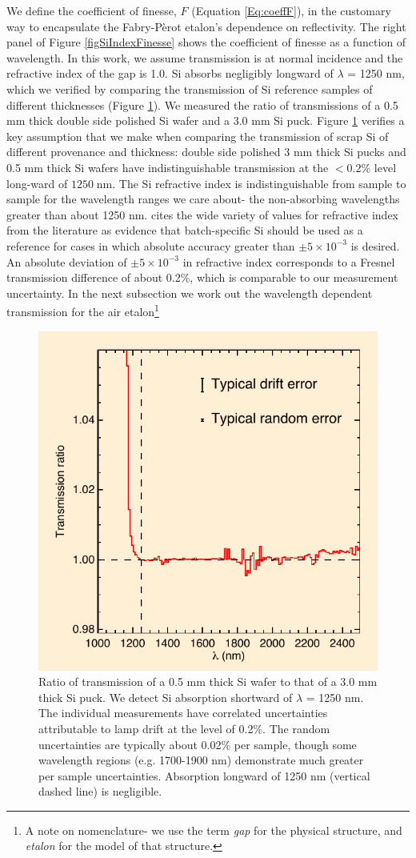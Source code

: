 \documentclass[osajnl,preprint,showpacs,superscriptaddress,12pt]{revtex4-1} %
\begin{document}
We define the coefficient of finesse\cite{2007fuph.book.....S}, $F$ (Equation \ref{Eq:coeffF}), in the customary way to encapsulate the Fabry-P\`{e}rot etalon's dependence on reflectivity.  The right panel of Figure \ref{figSiIndexFinesse} shows the coefficient of finesse as a function of wavelength.  In this work, we assume transmission is at normal incidence and the refractive index of the gap is 1.0.  Si absorbs negligibly longward of $\lambda$ = 1250 nm, which we verified by comparing the transmission of Si reference samples of different thicknesses (Figure \ref{figSiAbsorbfig}).  We measured the ratio of transmissions of a 0.5 mm thick double side polished Si wafer and a 3.0 mm Si puck.  Figure \ref{figSiAbsorbfig} verifies a key assumption that we make when comparing the transmission of scrap Si of different provenance and thickness: double side polished 3 mm thick Si pucks and 0.5 mm thick Si wafers have indistinguishable transmission at the $<0.2$\% level long-ward of $1250\;$nm.  The Si refractive index is indistinguishable from sample to sample for the wavelength ranges we care about- the non-absorbing wavelengths greater than about 1250 nm.  \cite{2006SPIE.6273E..77F} cites the wide variety of values for refractive index from the literature as evidence that batch-specific Si should be used as a reference for cases in which absolute accuracy greater than $\pm5\times10^{-3}$ is desired.  An absolute deviation of $\pm5\times10^{-3}$ in refractive index corresponds to a Fresnel transmission difference of about 0.2\%, which is comparable to our measurement uncertainty.  In the next subsection we work out the wavelength dependent transmission for the air etalon\footnote{A note on nomenclature- we use the term \emph{gap} for the physical structure, and \emph{etalon} for the model of that structure.}

\begin{figure}[htbp]
\includegraphics[width=0.40\columnwidth]{figs/fpAbsorbfig_alt}
\caption{Ratio of transmission of a 0.5 mm thick Si wafer to that of a 3.0 mm thick Si puck.  \label{figSiAbsorbfig} We detect Si absorption shortward of $\lambda$ = 1250 nm.  The individual measurements have correlated uncertainties attributable to lamp drift at the level of 0.2\%.  The random uncertainties are typically about 0.02\% per sample, though some wavelength regions (e.g. 1700-1900 nm) demonstrate much greater per sample uncertainties.  Absorption longward of 1250 nm (vertical dashed line) is negligible.}
\end{figure}
\end{document}
